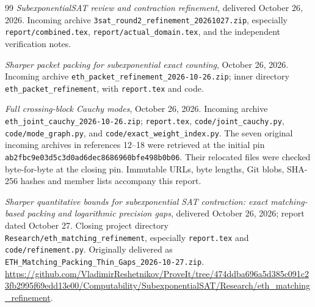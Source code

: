 \begin{thebibliography}{99}
 \emph{SubexponentialSAT review and contraction
refinement}, delivered October 26, 2026. Incoming archive
\nolinkurl{3sat_round2_refinement_20261027.zip}, especially
\nolinkurl{report/combined.tex}, \nolinkurl{report/actual_domain.tex}, and
the independent verification notes.

 \emph{Sharper packet packing for subexponential exact
counting}, October 26, 2026. Incoming archive
\nolinkurl{eth_packet_refinement_2026-10-26.zip}; inner directory
\nolinkurl{eth_packet_refinement}, with \nolinkurl{report.tex} and code.

 \emph{Full crossing-block Cauchy modes}, October 26, 2026.
Incoming archive \nolinkurl{eth_joint_cauchy_2026-10-26.zip};
\nolinkurl{report.tex}, \nolinkurl{code/joint_cauchy.py},
\nolinkurl{code/mode_graph.py}, and \nolinkurl{code/exact_weight_index.py}.
The seven original incoming archives in references 12--18 were retrieved
at the initial pin \nolinkurl{ab2fbc9e03d5c3d0ad6dec8686960bfe498b0b06}.
Their relocated files were checked byte-for-byte at the closing pin.
Immutable URLs, byte lengths, Git blobs, SHA-256 hashes and member lists
accompany this report.

 \emph{Sharper quantitative bounds for subexponential
SAT contraction: exact matching-based packing and logarithmic precision
gaps}, delivered October 26, 2026; report dated October 27.
Closing project directory \nolinkurl{Research/eth_matching_refinement},
especially \nolinkurl{report.tex} and \nolinkurl{code/refinement.py}.
Originally delivered as \nolinkurl{ETH_Matching_Packing_Thin_Gaps_2026-10-27.zip}.
\url{https://github.com/VladimirReshetnikov/ProveIt/tree/474ddba696a5d385c091c23fb2995f69edd13e00/Computability/SubexponentialSAT/Research/eth_matching_refinement}.
\end{thebibliography}
